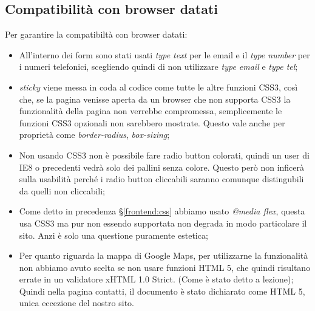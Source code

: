 \subsection{Compatibilità con browser datati}
Per garantire la compatibiltà con browser datati:
\begin{itemize}
\item All’interno dei form sono stati usati \textit{type text} per le email e il \textit{type number} per i numeri telefonici, scegliendo quindi di non utilizzare \textit{type email} e \textit{type tel};
\item \textit{sticky} viene messa in coda al codice come tutte le altre funzioni CSS3,  così che, se la pagina venisse aperta da un browser che non supporta CSS3 la funzionalità della pagina non verrebbe compromessa, semplicemente le funzioni CSS3 opzionali non sarebbero mostrate. Questo vale anche per proprietà come \textit{border-radius}, \textit{box-sizing};
\item Non usando CSS3 non è possibile fare radio button colorati, quindi un user di IE8 o precedenti vedrà solo dei pallini senza colore. Questo però non inficerà sulla usabilità perché i radio button cliccabili saranno comunque distingubili da quelli non cliccabili;
\item Come detto in precedenza §\ref{frontend:css} abbiamo usato \textit{@media flex}, questa usa CSS3 ma pur non essendo supportata non degrada in modo particolare il sito. Anzi è solo una questione puramente estetica;
\item Per quanto riguarda la mappa di Google Maps, per utilizzarne la funzionalità  non abbiamo avuto scelta se non usare funzioni HTML 5, che quindi risultano errate in un validatore xHTML 1.0 Strict. (Come è stato detto a lezione);
Quindi nella pagina contatti, il documento è stato dichiarato come HTML 5, unica eccezione del nostro sito.
\end{itemize}

